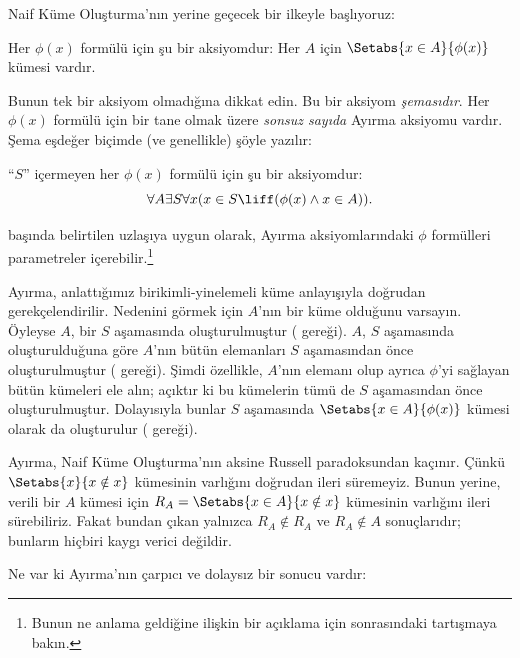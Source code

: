 


Naif Küme Oluşturma'nın yerine geçecek bir ilkeyle başlıyoruz:

\begin{axiom} Her $\phi(x)$ formülü için şu bir
aksiyomdur: Her $A$ için $\Setabs{x \in A}{\phi(x)}$ kümesi vardır.
\end{axiom}

Bunun tek bir aksiyom olmadığına dikkat edin. Bu bir aksiyom
\emph{şemasıdır}. Her $\phi(x)$ formülü için bir tane olmak üzere
\emph{sonsuz sayıda} Ayırma aksiyomu vardır. Şema eşdeğer biçimde
(ve genellikle) şöyle yazılır:

\begin{defish}
``$S$'' içermeyen her $\phi(x)$ formülü için şu bir aksiyomdur:
\[
	\forall A \exists S \forall x(x \in S \liff (\phi(x) \land x \in A)).
\]
\end{defish}

 başında belirtilen uzlaşıya uygun olarak,
Ayırma aksiyomlarındaki $\phi$ formülleri parametreler
içerebilir.\footnote{Bunun ne anlama geldiğine ilişkin bir açıklama için
 sonrasındaki
tartışmaya bakın.}

Ayırma, anlattığımız birikimli-yinelemeli küme anlayışıyla doğrudan
gerekçelendirilir. Nedenini görmek için $A$'nın bir küme olduğunu varsayın.
Öyleyse $A$, bir $S$ aşamasında oluşturulmuştur (\stageshier{} gereği).
$A$, $S$ aşamasında oluşturulduğuna göre $A$'nın bütün elemanları $S$
aşamasından önce oluşturulmuştur (\stagesacc{} gereği). Şimdi özellikle,
$A$'nın elemanı olup ayrıca $\phi$'yi sağlayan bütün kümeleri ele alın;
açıktır ki bu kümelerin tümü de $S$ aşamasından önce oluşturulmuştur.
Dolayısıyla bunlar $S$ aşamasında $\Setabs{x \in A}{\phi(x)}$ kümesi
olarak da oluşturulur (\stagesacc{} gereği).

Ayırma, Naif Küme Oluşturma'nın aksine Russell paradoksundan kaçınır.
Çünkü $\Setabs{x}{x \notin x}$ kümesinin varlığını doğrudan ileri
süremeyiz. Bunun yerine, verili bir $A$ kümesi için
$R_A = \Setabs{x \in A}{x \notin x}$ kümesinin varlığını ileri sürebiliriz.
Fakat bundan çıkan yalnızca $R_A \notin R_A$ ve $R_A \notin A$ sonuçlarıdır;
bunların hiçbiri kaygı verici değildir.

Ne var ki Ayırma'nın çarpıcı ve dolaysız bir sonucu vardır:

